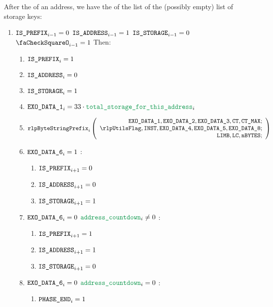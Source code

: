 \begin{enumerate}[resume]
		After the \rlp{} of an address, we have the \rlp{} of the list of the (possibly empty) list of storage keys:
		\begin{enumerate}[resume]
			\item \If $\texttt{IS\_PREFIX}_{i-1} = 0$ \et $\texttt{IS\_ADDRESS}_{i-1} = 1$ \et $\texttt{IS\_STORAGE}_{i-1} = 0$ \et $\done_{i-1} =1$ Then:
				\begin{enumerate}
					\item $\texttt{IS\_PREFIX} _{i} = 1$
					\item $\texttt{IS\_ADDRESS}   _{i} = 0$
					\item $\texttt{IS\_STORAGE}    _{i} = 1$
					\item $\exoDataColumn{1}_{i} = 33 \cdot \locTotStorageForThisAddress_{i}$
					\item
						\[
							\rlpBytestringPrefix_{i}
							\left(
							\begin{array}{r}
								\exoDataColumn{1},
								\exoDataColumn{2},
								\exoDataColumn{3},
								\ct,
								\maxCt; \\
								\rlpUtilsFlag,
								\INST,
								\exoDataColumn{4},
								\exoDataColumn{5},
								\exoDataColumn{8}; \\
								\limb,
								\lc,
								\limbsize; \\
							\end{array}
							\right)
						\]

					\item \If $\texttt{EXO\_DATA\_6}_{i} = 1$ \Then:
						\begin{enumerate}
							\item $\texttt{IS\_PREFIX} _{i+1} = 0$
							\item $\texttt{IS\_ADDRESS}   _{i+1} = 0$
							\item $\texttt{IS\_STORAGE}    _{i+1} = 1$
						\end{enumerate}

					\item \If $\texttt{EXO\_DATA\_6}_{i} = 0$ \et $\locAddressPrewarmingCountdown_{i} \neq 0$ \Then:
						\begin{enumerate}
							\item $\texttt{IS\_PREFIX} _{i+1} = 1$
							\item $\texttt{IS\_ADDRESS}   _{i+1} = 1$
							\item $\texttt{IS\_STORAGE}    _{i+1} = 0$
						\end{enumerate}

					\item \If $\texttt{EXO\_DATA\_6}_{i} = 0$ \et $\locAddressPrewarmingCountdown_{i} = 0$ \Then:
						\begin{enumerate}
							\item $\texttt{PHASE\_END} _{i} = 1$
						\end{enumerate}
				\end{enumerate}
		\end{enumerate}


\end{enumerate}
